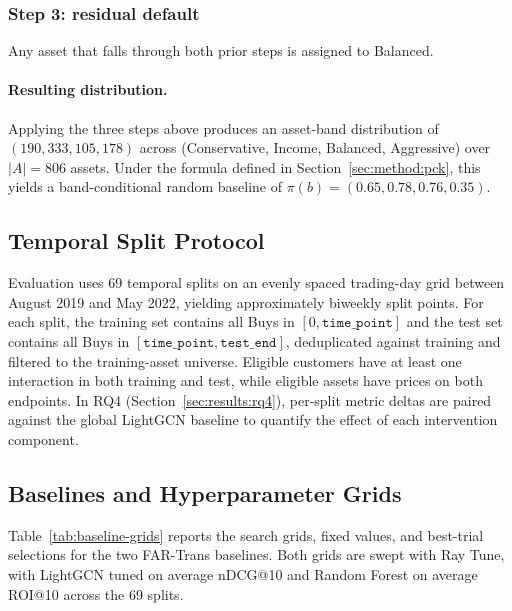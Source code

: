 \subsubsection{Step 3: residual default} Any asset that falls through both prior steps is assigned to Balanced.

\paragraph{Resulting distribution.} Applying the three steps above produces an asset-band distribution of $(190, 333, 105, 178)$ across (Conservative, Income, Balanced, Aggressive) over $|A| = 806$ assets. Under the formula defined in Section~\ref{sec:method:pck}, this yields a band-conditional random baseline of $\pi(b) = (0.65, 0.78, 0.76, 0.35)$.

\subsection{Temporal Split Protocol}
\label{sec:setup:splits}

Evaluation uses 69 temporal splits on an evenly spaced trading-day grid between August 2019 and May 2022, yielding approximately biweekly split points. For each split, the training set contains all Buys in $[0, \texttt{time\_point}]$ and the test set contains all Buys in $[\texttt{time\_point}, \texttt{test\_end}]$, deduplicated against training and filtered to the training-asset universe. Eligible customers have at least one interaction in both training and test, while eligible assets have prices on both endpoints. In RQ4 (Section~\ref{sec:results:rq4}), per-split metric deltas are paired against the global LightGCN baseline to quantify the effect of each intervention component.

\subsection{Baselines and Hyperparameter Grids}
\label{sec:setup:baselines}

Table~\ref{tab:baseline-grids} reports the search grids, fixed values, and best-trial selections for the two FAR-Trans baselines. Both grids are swept with Ray Tune, with LightGCN tuned on average nDCG@10 and Random Forest on average ROI@10 across the 69 splits.

